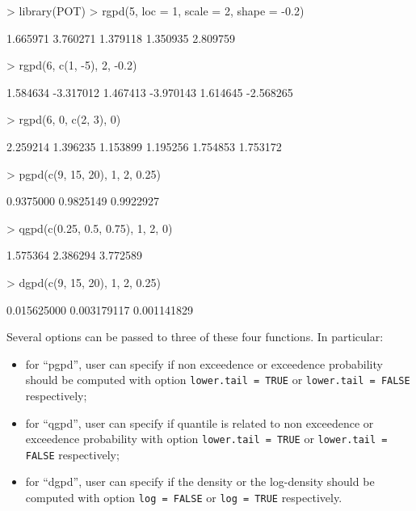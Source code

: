 \documentclass[a4paper]{article}
\numberwithin{equation}{section}
\theoremstyle{definition}
\begin{document}
\begin{Schunk}
\begin{Sinput}
> library(POT)
> rgpd(5, loc = 1, scale = 2, shape = -0.2)
\end{Sinput}
\begin{Soutput}
[1] 1.665971 3.760271 1.379118 1.350935 2.809759
\end{Soutput}
\begin{Sinput}
> rgpd(6, c(1, -5), 2, -0.2)
\end{Sinput}
\begin{Soutput}
[1]  1.584634 -3.317012  1.467413 -3.970143  1.614645 -2.568265
\end{Soutput}
\begin{Sinput}
> rgpd(6, 0, c(2, 3), 0)
\end{Sinput}
\begin{Soutput}
[1] 2.259214 1.396235 1.153899 1.195256 1.754853 1.753172
\end{Soutput}
\begin{Sinput}
> pgpd(c(9, 15, 20), 1, 2, 0.25)
\end{Sinput}
\begin{Soutput}
[1] 0.9375000 0.9825149 0.9922927
\end{Soutput}
\begin{Sinput}
> qgpd(c(0.25, 0.5, 0.75), 1, 2, 0)
\end{Sinput}
\begin{Soutput}
[1] 1.575364 2.386294 3.772589
\end{Soutput}
\begin{Sinput}
> dgpd(c(9, 15, 20), 1, 2, 0.25)
\end{Sinput}
\begin{Soutput}
[1] 0.015625000 0.003179117 0.001141829
\end{Soutput}
\end{Schunk}

Several options can be passed to three of these four functions. In
particular:
\begin{itemize}
\item for ``pgpd'', user can specify if non exceedence or exceedence
  probability should be computed with option \verb+lower.tail = TRUE+
  or  \verb+lower.tail = FALSE+ respectively;
\item for ``qgpd'', user can specify if quantile is related to non
  exceedence or exceedence probability with option
  \verb+lower.tail = TRUE+ or \verb+lower.tail = FALSE+ respectively;
\item for ``dgpd'', user can specify if the density or the log-density
  should be computed with option \verb+log = FALSE+ or
  \verb+log = TRUE+ respectively.
\end{itemize}
\end{document}
